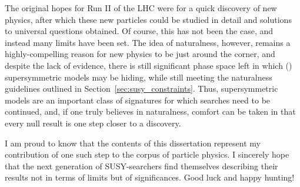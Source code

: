 The original hopes for Run II of the LHC were for a quick discovery of new physics, after which these new particles could be studied in detail and solutions to universal questions obtained.
Of course, this has not been the case, and instead many limits have been set.
The idea of naturalness, however, remains a highly-compelling reason for new physics to be just around the corner, and despite the lack of evidence, there is still significant phase space left in which (\RPV) supersymmetric models may be hiding, while still meeting the naturalness guidelines outlined in Section~\ref{sec:susy_constraints}.
Thus, supersymmetric models are an important class of signatures for which searches need to be continued, and, if one truly believes in naturalness, comfort can be taken in that every null result is one step closer to a discovery.

I am proud to know that the contents of this dissertation represent my contribution of one such step to the corpus of particle physics. I sincerely hope that the next generation of SUSY-searchers find themselves describing their results not in terms of limits but of significances.
Good luck and happy hunting!
